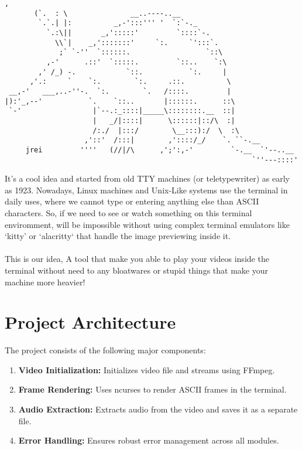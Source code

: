\documentclass[a4paper,12pt]{article}
\begin{document}
\begin{lstlisting}[caption={An ASCII art for Ant bear from https://www.asciiart.eu/animals/aardvarks}]
            ,
       (`.  : \               __..----..__
        `.`.| |:          _,-':::''' '  `:`-._
          `.:\||       _,':::::'         `::::`-.
            \\`|    _,':::::::'     `:.     `':::`.
             ;` `-''  `::::::.                  `::\
          ,-'      .::'  `:::::.         `::..    `:\
        ,' /_) -.            `::.           `:.     |
      ,'.:     `    `:.        `:.     .::.          \
 __,-'   ___,..-''-.  `:.        `.   /::::.         |
|):'_,--'           `.    `::..       |::::::.      ::\
 `-'                 |`--.:_::::|_____\::::::::.__  ::|
                     |   _/|::::|      \::::::|::/\  :|
                     /:./  |:::/        \__:::):/  \  :\
                   ,'::'  /:::|        ,'::::/_/    `. ``-.__
     jrei         ''''   (//|/\      ,';':,-'         `-.__  `'--..__
                                                           `''---::::'

\end{lstlisting}


It's a cool idea and started from old TTY machines (or teletypewriter) as early as 1923. Nowadays, Linux machines and Unix-Like systems use the terminal in daily uses, where we cannot type or entering anything else than ASCII characters. So, if we need to see or watch something on this terminal enviromment, will be impossible without using complex terminal emulators like `kitty' or `alacritty` that handle the image previewing inside it. \\ \\
This is our idea, A tool that make you able to play your videos inside the terminal without need to any bloatwares or stupid things that make your machine more heavier!

\section{Project Architecture}
The project consists of the following major components:
\begin{enumerate}
    \item \textbf{Video Initialization:} Initializes video file and streams using FFmpeg.
    \item \textbf{Frame Rendering:} Uses ncurses to render ASCII frames in the terminal.
    \item \textbf{Audio Extraction:} Extracts audio from the video and saves it as a separate file.
    \item \textbf{Error Handling:} Ensures robust error management across all modules.
\end{enumerate}
\end{document}
